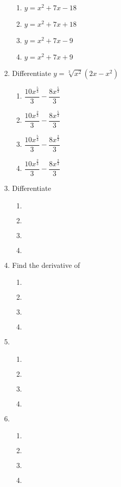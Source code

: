 \begin{multicols}{2}
\begin{enumerate}[label={\arabic*.}]
	\begin{enumerate}[label={\Alph*.}]
	\item \(y = {x}^{2}+7x-18\)
	\item \(y = {x}^{2}+7x+18\)
	\item \(y = {x}^{2}+7x-9\)
	\item \(y = {x}^{2}+7x+9\)
	\end{enumerate}
\item Differentiate \(y = \sqrt[3]{{x}^{2}}(2x-{x}^{2})\)
	\begin{enumerate}[label={\Alph*.}]
	\item \(\dfrac{10{x}^{\frac{5}{3}}}{3} -\dfrac{8{x}^{\frac{5}{3}}}{3}\)
	\item \(\dfrac{10{x}^{\frac{2}{3}}}{3} -\dfrac{8{x}^{\frac{5}{3}}}{3}\)
	\item \(\dfrac{10{x}^{\frac{5}{3}}}{3} -\dfrac{8{x}^{\frac{2}{3}}}{3}\)
	\item \(\dfrac{10{x}^{\frac{2}{3}}}{3} -\dfrac{8{x}^{\frac{2}{3}}}{3}\)
	\end{enumerate}
\item Differentiate
	\begin{enumerate}[label={\Alph*.}]
	\item \(\)
	\item \(\)
	\item \(\)
	\item \(\)
	\end{enumerate}
\item Find the derivative of 
	\begin{enumerate}[label={\Alph*.}]
	\item \(\)
	\item \(\)
	\item \(\)
	\item \(\)
	\end{enumerate}
\item
	\begin{enumerate}[label={\Alph*.}]
	\item \(\)
	\item \(\)
	\item \(\)
	\item \(\)
	\end{enumerate}
\item
	\begin{enumerate}[label={\Alph*.}]
	\item \(\)
	\item \(\)
	\item \(\)
	\item \(\)

\end{enumerate}
\end{enumerate}
\end{multicols}
